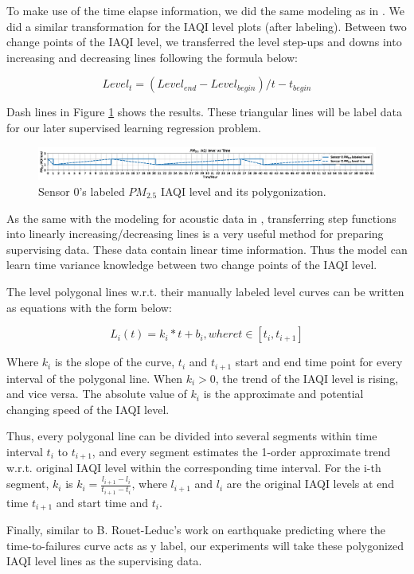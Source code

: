 To make use of the time elapse information, we did the same modeling as in \cite{rouet2017machine}. We did a similar transformation for the IAQI level plots (after labeling). Between two change points of the IAQI level, we transferred the level step-ups and downs into increasing and decreasing lines following the formula below:

\begin{equation}
    Level_t = (Level_{end}-Level_{begin}) / t-t_{begin}
\end{equation}

Dash lines in Figure \ref{fig:pm25_0_labeled_level} shows the results. These triangular lines will be label data for our later supervised learning regression problem.

\begin{figure}
    \centering
    \includegraphics[width=\linewidth]{fig/labeled_iaqi_level/pm25_0_labeled_iaqi_level.png}
    \caption{Sensor 0's labeled $PM_{2.5}$ IAQI level and its polygonization.}
    \label{fig:pm25_0_labeled_level}
\end{figure}

As the same with the modeling for acoustic data in \cite{rouet2017machine}, transferring step functions into linearly increasing/decreasing lines is a very useful method for preparing supervising data. These data contain linear time information. Thus the model can learn time variance knowledge between two change points of the IAQI level.

The level polygonal lines w.r.t. their manually labeled level curves can be written as equations with the form below:

\begin{equation}
    \label{formula:polygonal}
    L_i(t)=k_i*t+b_i, where t\in[t_i,t_{i+1}]
\end{equation}

Where $k_i$ is the slope of the curve, $t_i$ and $t_{i+1}$ start and end time point for every interval of the polygonal line. When $k_i>0$, the trend of the IAQI level is rising, and vice versa. The absolute value of $k_i$ is the approximate and potential changing speed of the IAQI level.

Thus, every polygonal line can be divided into several segments within time interval $t_i$ to $t_{i+1}$, and every segment estimates the 1-order approximate trend w.r.t. original IAQI level within the corresponding time interval. For the i-th segment, $k_i$ is $k_i =\frac{l_{i+1}-l_i}{t_{i+1}-t_i}$, where $l_{i+1}$ and $l_i$ are the original IAQI levels at end time $t_{i+1}$ and start time and $t_i$.

Finally, similar to B. Rouet-Leduc's work on earthquake predicting \cite{rouet2017machine} where the time-to-failures curve acts as y label, our experiments will take these polygonized IAQI level lines as the supervising data.

